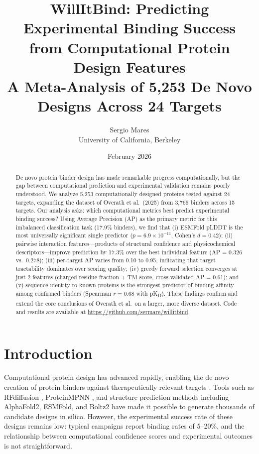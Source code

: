 \documentclass[11pt,a4paper]{article}
\title{\textbf{WillItBind}: Predicting Experimental Binding Success\\from Computational Protein Design Features\\[0.4em]
\large A Meta-Analysis of 5,253 De Novo Designs Across 24 Targets}
\author{Sergio Mares \\ University of California, Berkeley}
\date{February 2026}
\newcommand{\pKD}{pK\textsubscript{D}}
\begin{document}
\maketitle

\begin{abstract}
De novo protein binder design has made remarkable progress computationally, but the gap between computational prediction and experimental validation remains poorly understood.
We analyze 5,253 computationally designed proteins tested against 24 targets, expanding the dataset of Overath et al.\ (2025) from 3,766 binders across 15 targets.
Our analysis asks: which computational metrics best predict experimental binding success?
Using Average Precision (AP) as the primary metric for this imbalanced classification task (17.9\% binders), we find that (i) ESMFold pLDDT is the most universally significant single predictor ($p = 6.9 \times 10^{-11}$, Cohen's $d = 0.42$); (ii) pairwise interaction features---products of structural confidence and physicochemical descriptors---improve prediction by 17.3\% over the best individual feature (AP = 0.326 vs.\ 0.278); (iii) per-target AP varies from 0.10 to 0.95, indicating that target tractability dominates over scoring quality; (iv) greedy forward selection converges at just 2 features (charged residue fraction + TM-score, cross-validated AP = 0.61); and (v) sequence identity to known proteins is the strongest predictor of binding affinity among confirmed binders (Spearman $r = 0.68$ with \pKD).
These findings confirm and extend the core conclusions of Overath et al.\ on a larger, more diverse dataset.
Code and results are available at \url{https://github.com/sermare/willitbind}.
\end{abstract}

\section{Introduction}

Computational protein design has advanced rapidly, enabling the de novo creation of protein binders against therapeutically relevant targets \cite{overath2025}.
Tools such as RFdiffusion \cite{watson2023}, ProteinMPNN \cite{dauparas2022}, and structure prediction methods including AlphaFold2, ESMFold, and Boltz2 have made it possible to generate thousands of candidate designs in silico.
However, the experimental success rate of these designs remains low: typical campaigns report binding rates of 5--20\%, and the relationship between computational confidence scores and experimental outcomes is not straightforward.
\end{document}
